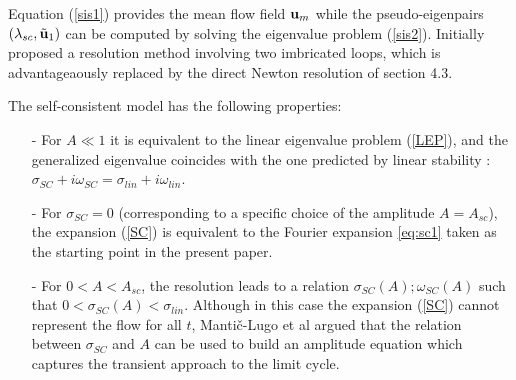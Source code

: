 \documentclass[twocolumn,10pt]{asme2ej}
\begin{document}
Equation (\ref{sis1}) provides the mean flow field ${\bf u }_m$ while the 
pseudo-eigenpairs $(\lambda_{sc},  \tilde{{\bf u }}_1)$ can be computed by solving the eigenvalue problem (\ref{sis2}).
\cite{MLugo2014} Initially proposed a resolution method involving two imbricated loops, which is advantageaously replaced by
the direct Newton resolution of section 4.3. 


The self-consistent model has the following properties:
\begin{itemize}
\item[-] For $ A \ll 1$ it is equivalent to the linear eigenvalue problem (\ref{LEP}), and the generalized eigenvalue coincides with the one predicted by linear stability : $\sigma_{SC} + i \omega_{SC} = \sigma_{lin} + i \omega_{lin}$.
\item[-] For $\sigma_{SC}=0$ (corresponding to a specific choice of the amplitude $A=A_{sc}$),  the expansion (\ref{SC}) is equivalent to 
the Fourier expansion \ref{eq:sc1} taken as the starting point in the present paper. 
\item[-] For $0<A<A_{sc}$, the resolution leads to a relation $\sigma_{SC}(A) ; \omega_{SC}(A)$
such that $0< \sigma_{SC}(A) < \sigma_{lin}$.
 Although in this case the expansion ({\ref{SC}}) cannot represent the flow for all $t$, Manti\v{c}-Lugo et al \cite{MLugo2014} argued that the relation between $\sigma_{SC}$ and $A$ can be used to build an amplitude equation which captures the transient approach to the limit cycle. 
\end{itemize}

\end{document}
